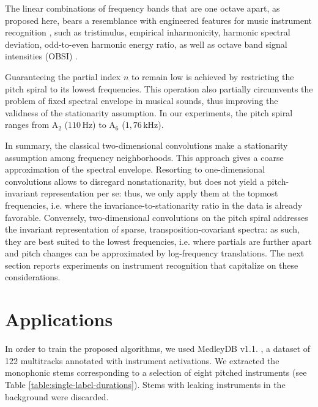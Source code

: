 \documentclass{article}
\makeatletter
\newcommand*{\ie}{i.e.\@\xspace}
\makeatother
\begin{document}
The linear combinations of frequency bands that are one octave apart,
as proposed here,
bears a resemblance with engineered features for music instrument
recognition \cite{Peeters2004}, such as tristimulus, 
empirical inharmonicity, harmonic spectral deviation,
odd-to-even harmonic energy ratio, as well as
octave band signal intensities (OBSI) \cite{Joder2009}.

Guaranteeing the partial index $n$ to remain low is achieved by
restricting the pitch spiral to its lowest frequencies.
This operation also partially circumvents the problem of fixed spectral envelope
in musical sounds, thus improving the validness of the stationarity assumption.
In our experiments, the pitch spiral ranges from
$\mathrm{A_2}$ ($110\,\mathrm{Hz}$) to
$\mathrm{A_6}$ ($1,76\,\mathrm{kHz}$).

In summary, the classical two-dimensional convolutions make a stationarity assumption
among frequency neighborhoods. This approach gives a coarse approximation
of the spectral envelope.
Resorting to one-dimensional convolutions allows to disregard nonstationarity,
but does not yield a pitch-invariant representation per se:
thus, we only apply them at the topmost frequencies, \ie where the
invariance-to-stationarity ratio in the data is already favorable.
Conversely, two-dimensional convolutions on the pitch spiral addresses
the invariant representation of sparse, transposition-covariant spectra:
as such, they are best suited to the lowest frequencies,
\ie where partials
are further apart and pitch changes can be approximated by log-frequency
translations.
The next section reports experiments on instrument recognition that capitalize
on these considerations.

\section{Applications}\label{sec:single-instrument}
In order to train the proposed algorithms, we used MedleyDB v1.1. \cite{Bittner2014}, a
dataset of 122 multitracks annotated with instrument activations. 
We extracted the monophonic stems corresponding to a selection of eight pitched
instruments (see Table \ref{table:single-label-durations}).
Stems with leaking instruments in the background were discarded.
\end{document}
